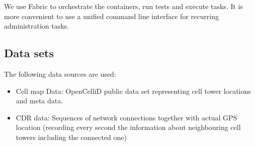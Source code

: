 We use Fabric to orchestrate the containers, run tests and execute tasks. It is more convenient to use a unified command line interface for recurring administration tasks. \cite{fabric}

\subsection{Data sets}
The following data sources are used:
\begin{itemize}
\item Cell map Data: OpenCelliD public data set representing cell tower locations and meta data.
\item CDR data: Sequences of network connections together with actual GPS location (recording every second the information about neighbouring cell towers including the connected one)
\end{itemize}

